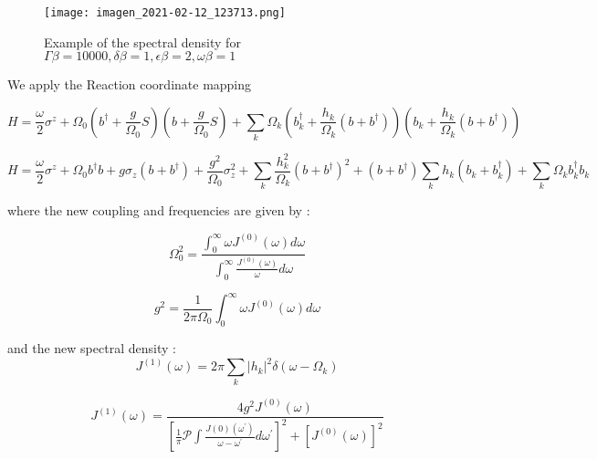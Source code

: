 \documentclass[%
preprint,
onecolumn,
notitlepag,
 amsmath,amssymb,
 aps,
 pra,
]{revtex4-2}
\providecommand{\abs}[1]{\lvert#1\rvert}
\begin{document}
\begin{figure}[h]
\texttt{[image: imagen\_2021-02-12\_123713.png]}
\caption{Example of the spectral density for $\Gamma \beta=10000, \delta \beta=1, \epsilon \beta=2, \omega \beta=1$}
\end{figure}


We apply the Reaction coordinate mapping


\begin{equation}
H=\frac{\omega}{2} \sigma^{z}+\Omega_{0}\left(b^{\dagger}+\frac{g}{\Omega_{0}} S\right)\left(b+\frac{g}{\Omega_{0}} S\right)+\sum_{k} \Omega_{k}\left(b_{k}^{\dagger}+\frac{h_{k}}{\Omega_{k}}\left(b+b^{\dagger}\right)\right)\left(b_{k}+\frac{h_{k}}{\Omega_{k}}\left(b+b^{\dagger}\right)\right)
\end{equation}

\begin{equation}
    H=\frac{\omega}{2} \sigma^{z} +\Omega_0 b ^{\dagger} b  + g \sigma_z \left( b + b ^{\dagger} \right) + \frac{g^2}{\Omega_0} \sigma_z^2 + \sum_k \frac{h_k^2}{\Omega_k} \left( b + b ^{\dagger} \right)^2 + \left( b + b ^{\dagger} \right) \sum_k h_k \left( b_k + b_k ^{\dagger} \right) + \sum_{k} \Omega_k b_k ^{\dagger} b_k
\end{equation}

where the new coupling and frequencies are given by :

\begin{equation}\Omega_{0}^{2}=\frac{\int_{0}^{\infty} \omega J^{(0)}(\omega) d \omega}{\int_{0}^{\infty} \frac{J^{(0)}(\omega)}{\omega} d \omega}\end{equation}



\begin{equation}g^{2}=\frac{1}{2 \pi \Omega_{0}} \int_{0}^{\infty} \omega J^{(0)}(\omega) d \omega\end{equation}

and  the new spectral density :
\begin{equation}
    J^{(1)}(\omega) = 2 \pi \sum_{k} \abs{h_k}^2 \delta(\omega-\Omega_k)
\end{equation}

\begin{equation}J^{(1)}(\omega)=\frac{4 g^{2} J^{(0)}(\omega)}{\left[\frac{1}{\pi} \mathcal{P} \int \frac{J(0)\left(\omega^{\prime}\right)}{\omega-\omega^{\prime}} d \omega^{\prime}\right]^{2}+\left[J^{(0)}(\omega)\right]^{2}}\end{equation}
\end{document}
